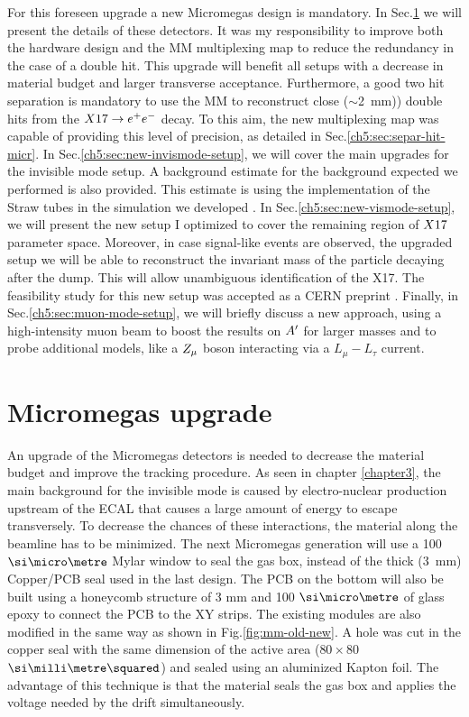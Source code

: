 For this foreseen upgrade a new Micromegas design is mandatory. In Sec.\ref{ch5:sec:mm-upgrades} we will present the details of these detectors. It was my responsibility to improve both the hardware design and the MM multiplexing map to reduce the redundancy in the case of a double hit. This upgrade will benefit all setups with a decrease in material budget and larger transverse acceptance. Furthermore, a good two hit separation is mandatory to use the MM to reconstruct close ($\sim$\SI{2}{mm})) double hits from the $X17 \to e^+e^-$ decay. To this aim, the new multiplexing map was capable of providing this level of precision, as detailed in Sec.\ref{ch5:sec:separ-hit-micr}.
In Sec.\ref{ch5:sec:new-invismode-setup}, we will cover the main upgrades for the invisible mode setup. A background estimate for the background expected we performed is also provided. This estimate is using the implementation of the Straw tubes in the simulation we developed \cite{pdegen-thesis}. In Sec.\ref{ch5:sec:new-vismode-setup}, we will present the new setup I optimized to cover the remaining region of $X17$ parameter space. Moreover, in case signal-like events are observed, the upgraded setup we will be able to reconstruct the invariant mass of the particle decaying after the dump. This will allow unambiguous identification of the X17.
The feasibility study for this new setup was accepted as a CERN preprint \cite{Depero:2020zfy}. Finally, in Sec.\ref{ch5:sec:muon-mode-setup}, we will briefly discuss a new approach, using a high-intensity muon beam to boost the results on $A'$ for larger masses and to probe additional models, like a $Z_{\mu}$ boson interacting via a $L_{\mu} - L_{\tau}$ current.

\section{Micromegas upgrade}
\label{ch5:sec:mm-upgrades}

An upgrade of the Micromegas detectors is needed to decrease the material budget and improve the tracking procedure. As seen in chapter \ref{chapter3}, the main background for the invisible mode is caused by electro-nuclear production upstream of the ECAL that causes a large amount of energy to escape transversely. To decrease the chances of these interactions, the material along the beamline has to be minimized. The next Micromegas generation will use a 100 $\mum$ Mylar window to seal the gas box, instead of the thick (\SI{3}{mm})
Copper/PCB seal used in the last design. The PCB on the bottom will also be built using a honeycomb structure of 3 mm and 100 $\mum$ of glass epoxy to connect the PCB to the XY strips. The existing modules are also modified in the same way as shown in Fig.\ref{fig:mm-old-new}. A hole was cut in the copper seal with the same dimension of the active area ($80 \times 80$ $\mms$) and sealed using an aluminized Kapton foil. The advantage of this technique is that the material seals the gas box and applies the voltage needed by the drift simultaneously.

